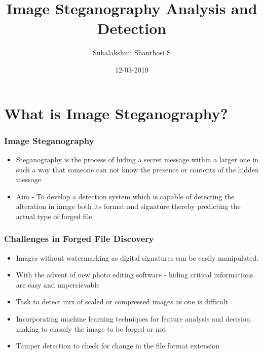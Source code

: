 \documentclass{beamer} %
\title{Image Steganography Analysis and Detection}
\author{Subalakshmi Shanthosi S}
\institute{SSN College of Engineering}
\date{}
\date[short date]{12-03-2019}
\theoremstyle{definition} %
\begin{document}
\begin{frame} 
\titlepage
\end{frame}

\section{What is Image Steganography?} %

\begin{frame} 
\frametitle{Image Steganography}
 \begin{itemize}
 \item{Steganography is the process of hiding a secret message within a
 larger one in such a way that someone can not know the presence or contents
 of the hidden message }
\end{itemize}
\begin{itemize}
 \item{Aim - To develop a detection system which is capable of detecting the alteration in image both its format and signature thereby predicting the actual type of forged file 
 }
\end{itemize}

\end{frame}

\begin{frame}
\frametitle{Challenges in Forged File Discovery}
 \begin{itemize}
	\item{Images without watermarking as digital signatures can be easily manipulated.}
\end{itemize}
\begin{itemize}
	\item{With the advent of new photo editing software - hiding critical informations are easy and unpercievable }
\end{itemize}
\begin{itemize}
	\item {Task to detect mix of scaled or compressed images as one is difficult}
\end{itemize}
\begin{itemize}
	\item{Incorporating machine learning techniques for feature analysis and decision making  to classify the image to be forged or not  
	}
   \item{Tamper detection to check for change in the file format extension}
\end{itemize}
\end{frame}
\end{document}
